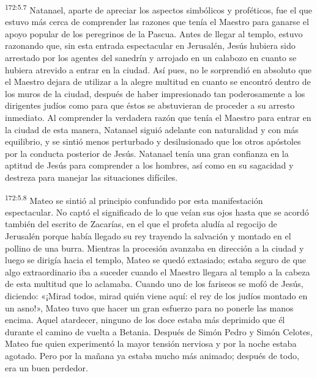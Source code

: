 \par 
\textsuperscript{172:5.7} Natanael, aparte de apreciar los aspectos simbólicos y proféticos, fue el que estuvo más cerca de comprender las razones que tenía el Maestro para ganarse el apoyo popular de los peregrinos de la Pascua. Antes de llegar al templo, estuvo razonando que, sin esta entrada espectacular en Jerusalén, Jesús hubiera sido arrestado por los agentes del sanedrín y arrojado en un calabozo en cuanto se hubiera atrevido a entrar en la ciudad. Así pues, no le sorprendió en absoluto que el Maestro dejara de utilizar a la alegre multitud en cuanto se encontró dentro de los muros de la ciudad, después de haber impresionado tan poderosamente a los dirigentes judíos como para que éstos se abstuvieran de proceder a su arresto inmediato. Al comprender la verdadera razón que tenía el Maestro para entrar en la ciudad de esta manera, Natanael siguió adelante con naturalidad y con más equilibrio, y se sintió menos perturbado y desilusionado que los otros apóstoles por la conducta posterior de Jesús. Natanael tenía una gran confianza en la aptitud de Jesús para comprender a los hombres, así como en su sagacidad y destreza para manejar las situaciones difíciles.

\par 
\textsuperscript{172:5.8} Mateo se sintió al principio confundido por esta manifestación espectacular. No captó el significado de lo que veían sus ojos hasta que se acordó también del escrito de Zacarías, en el que el profeta aludía al regocijo de Jerusalén porque había llegado su rey trayendo la salvación y montado en el pollino de una burra. Mientras la procesión avanzaba en dirección a la ciudad y luego se dirigía hacia el templo, Mateo se quedó extasiado; estaba seguro de que algo extraordinario iba a suceder cuando el Maestro llegara al templo a la cabeza de esta multitud que lo aclamaba. Cuando uno de los fariseos se mofó de Jesús, diciendo: «¡Mirad todos, mirad quién viene aquí: el rey de los judíos montado en un asno!», Mateo tuvo que hacer un gran esfuerzo para no ponerle las manos encima. Aquel atardecer, ninguno de los doce estaba más deprimido que él durante el camino de vuelta a Betania. Después de Simón Pedro y Simón Celotes, Mateo fue quien experimentó la mayor tensión nerviosa y por la noche estaba agotado. Pero por la mañana ya estaba mucho más animado; después de todo, era un buen perdedor.

